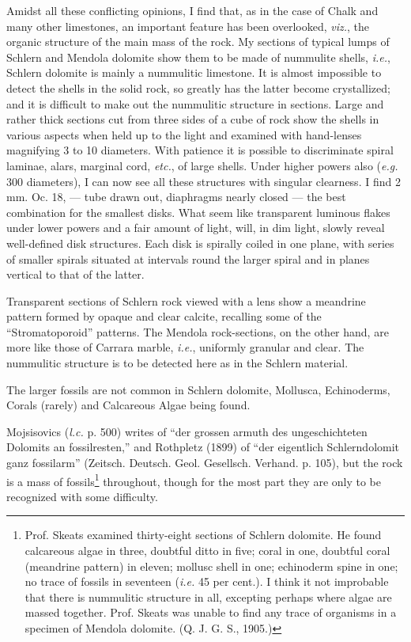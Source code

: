 \documentclass[a4paper, 12pt, oneside]{article}
\begin{document}
Amidst all these conflicting opinions, I find that, as in the case of Chalk and many other limestones, an important feature has been overlooked, \emph{viz.}, the organic structure of the main mass of the rock. My sections of typical lumps of Schlern and Mendola dolomite show them to be made of nummulite shells, \emph{i.e.}, Schlern dolomite is mainly a nummulitic limestone. It is almost impossible to detect the shells in the solid rock, so greatly has the latter become crystallized; and it is difficult to make out the nummulitic structure in sections. Large and rather thick sections cut from three sides of a cube of rock show the shells in various aspects when held up to the light and examined with hand-lenses magnifying 3 to 10 diameters. With patience it is possible to discriminate spiral laminae, alars, marginal cord, \emph{etc.}, of large shells. Under higher powers also (\emph{e.g.} 300 diameters), I can now see all these structures with singular clearness. I find 2 mm. Oc. 18, --- tube drawn out, diaphragms nearly closed --- the best combination for the smallest disks. What seem like transparent luminous flakes under lower powers and a fair amount of light, will, in dim light, slowly reveal well-defined disk structures. Each disk is spirally coiled in one plane, with series of smaller spirals situated at intervals round the larger spiral and in planes vertical to that of the latter.

Transparent sections of Schlern rock viewed with a lens show a meandrine pattern formed by opaque and clear calcite, recalling some of the ``Stromatoporoid'' patterns. The Mendola rock-sections, on the other hand, are more like those of Carrara marble, \emph{i.e.}, uniformly granular and clear. The nummulitic structure is to be detected here as in the Schlern material.

The larger fossils are not common in Schlern dolomite, Mollusca, Echinoderms, Corals (rarely) and Calcareous Algae being found.

Mojsisovics (\emph{l.c.} p. 500) writes of ``der grossen armuth des ungeschichteten Dolomits an fossilresten,'' and Rothpletz (1899) of ``der eigentlich Schlerndolomit ganz fossilarm'' (Zeitsch. Deutsch. Geol. Gesellsch. Verhand. p. 105), but the rock is a mass of fossils\footnote{Prof. Skeats examined thirty-eight sections of Schlern dolomite. He found calcareous algae in three, doubtful ditto in five; coral in one, doubtful coral (meandrine pattern) in eleven; mollusc shell in one; echinoderm spine in one; no trace of fossils in seventeen (\emph{i.e.} 45 per cent.). I think it not improbable that there is nummulitic structure in all, excepting perhaps where algae are massed together. Prof. Skeats was unable to find any trace of organisms in a specimen of Mendola dolomite. (Q. J. G. S., 1905.)} throughout, though for the most part they are only to be recognized with some difficulty.
\end{document}
